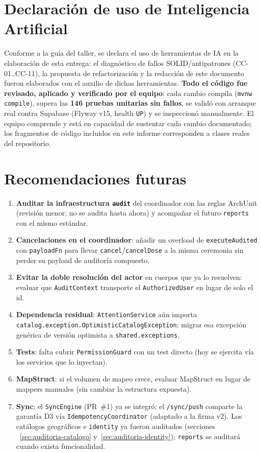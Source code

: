 \documentclass[11pt,a4paper]{article}
\begin{document}
\section{Declaración de uso de Inteligencia Artificial} \label{sec:ia}

Conforme a la guía del taller, se declara el uso de herramientas de IA en la
elaboración de esta entrega: el diagnóstico de fallos SOLID/antipatrones
(CC-01..CC-11), la propuesta de refactorización y la redacción de este
documento fueron elaborados con el auxilio de dichas herramientas.
\textbf{Todo el código fue revisado, aplicado y verificado por el equipo}:
cada cambio compila (\texttt{mvnw compile}), supera las \textbf{146 pruebas
unitarias sin fallos}, se validó con arranque real contra Supabase (Flyway v15,
health \texttt{UP}) y se inspeccionó manualmente. El equipo comprende y está en
capacidad de sustentar cada cambio documentado; los fragmentos de código
incluidos en este informe corresponden a clases reales del repositorio.

\section{Recomendaciones futuras}

\begin{enumerate}
  \item \textbf{Auditar la infraestructura \texttt{audit}} del coordinador con
        las reglas ArchUnit (revisión menor; no se audita hasta ahora) y
        acompañar el futuro \texttt{reports} con el mismo estándar.
  \item \textbf{Cancelaciones en el coordinador}: añadir un overload de
        \texttt{executeAudited} con \texttt{payloadFn} para llevar
        \texttt{cancel}/\texttt{cancelDose} a la misma ceremonia sin perder su
        payload de auditoría compuesto.
  \item \textbf{Evitar la doble resolución del actor} en cuerpos que ya lo
        resuelven: evaluar que \texttt{AuditContext} transporte el
        \texttt{AuthorizedUser} en lugar de solo el id.
  \item \textbf{Dependencia residual}: \texttt{AttentionService} aún importa
        \texttt{catalog.exception.OptimisticCatalogException}; migrar esa
        excepción genérica de versión optimista a \texttt{shared.exceptions}.
  \item \textbf{Tests}: falta cubrir \texttt{PermissionGuard} con un test
        directo (hoy se ejercita vía los servicios que lo inyectan).
  \item \textbf{MapStruct}: si el volumen de mapeo crece, evaluar MapStruct en
        lugar de mappers manuales (sin cambiar la estructura expuesta).
  \item \textbf{Sync}: el \texttt{SyncEngine} (PR~\#1) ya se integró; el
        \texttt{/sync/push} comparte la garantía D3 vía
        \texttt{IdempotencyCoordinator} (adaptado a la firma v2). Los catálogos
        geográficos e \texttt{identity} ya fueron auditados (secciones
        ~\ref{sec:auditoria-catalogo} y~\ref{sec:auditoria-identity});
        \texttt{reports} se auditará cuando exista funcionalidad.
\end{enumerate}
\end{document}
